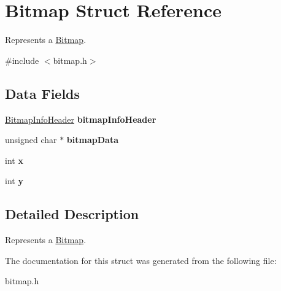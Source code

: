\hypertarget{struct_bitmap}{}\section{Bitmap Struct Reference}
\label{struct_bitmap}


Represents a \hyperlink{struct_bitmap}{Bitmap}.  




{\ttfamily \#include $<$bitmap.\+h$>$}

\subsection*{Data Fields}
\begin{DoxyCompactItemize}
\item 
\hypertarget{struct_bitmap_a7157ca7f3ce4be47481c472fafd89313}{}\label{struct_bitmap_a7157ca7f3ce4be47481c472fafd89313} 
\hyperlink{struct_bitmap_info_header}{Bitmap\+Info\+Header} {\bfseries bitmap\+Info\+Header}
\item 
\hypertarget{struct_bitmap_a586c4bcc42cf22a033e8f60f24f627f0}{}\label{struct_bitmap_a586c4bcc42cf22a033e8f60f24f627f0} 
unsigned char $\ast$ {\bfseries bitmap\+Data}
\item 
\hypertarget{struct_bitmap_a6150e0515f7202e2fb518f7206ed97dc}{}\label{struct_bitmap_a6150e0515f7202e2fb518f7206ed97dc} 
int {\bfseries x}
\item 
\hypertarget{struct_bitmap_a0a2f84ed7838f07779ae24c5a9086d33}{}\label{struct_bitmap_a0a2f84ed7838f07779ae24c5a9086d33} 
int {\bfseries y}
\end{DoxyCompactItemize}


\subsection{Detailed Description}
Represents a \hyperlink{struct_bitmap}{Bitmap}. 

The documentation for this struct was generated from the following file\+:\begin{DoxyCompactItemize}
\item 
bitmap.\+h\end{DoxyCompactItemize}
